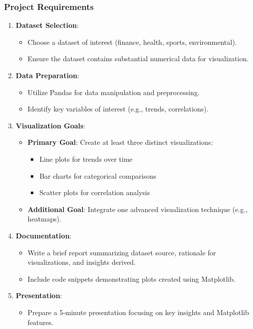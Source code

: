 \documentclass{beamer}
\begin{document}
\begin{frame}
    \frametitle{Project Requirements}
    \begin{enumerate}
        \item \textbf{Dataset Selection}:
        \begin{itemize}
            \item Choose a dataset of interest (finance, health, sports, environmental).
            \item Ensure the dataset contains substantial numerical data for visualization.
        \end{itemize}
        
        \item \textbf{Data Preparation}:
        \begin{itemize}
            \item Utilize Pandas for data manipulation and preprocessing.
            \item Identify key variables of interest (e.g., trends, correlations).
        \end{itemize}
        
        \item \textbf{Visualization Goals}:
        \begin{itemize}
            \item \textbf{Primary Goal}: Create at least three distinct visualizations:
            \begin{itemize}
                \item Line plots for trends over time
                \item Bar charts for categorical comparisons
                \item Scatter plots for correlation analysis
            \end{itemize}
            \item \textbf{Additional Goal}: Integrate one advanced visualization technique (e.g., heatmaps).
        \end{itemize}
        
        \item \textbf{Documentation}:
        \begin{itemize}
            \item Write a brief report summarizing dataset source, rationale for visualizations, and insights derived.
            \item Include code snippets demonstrating plots created using Matplotlib.
        \end{itemize}
        
        \item \textbf{Presentation}:
        \begin{itemize}
            \item Prepare a 5-minute presentation focusing on key insights and Matplotlib features.
        \end{itemize}
    \end{enumerate}
\end{frame}
\end{document}
